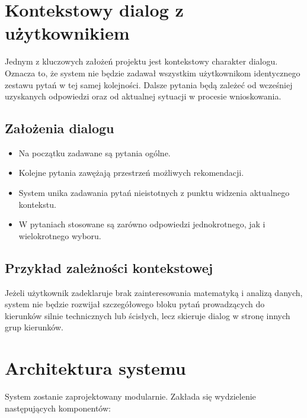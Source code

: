 \documentclass[12pt,a4paper,oneside]{article}
\begin{document}
\section{Kontekstowy dialog z użytkownikiem}

Jednym z kluczowych założeń projektu jest kontekstowy charakter dialogu. Oznacza to, że system nie będzie zadawał wszystkim użytkownikom identycznego zestawu pytań w tej samej kolejności. Dalsze pytania będą zależeć od wcześniej uzyskanych odpowiedzi oraz od aktualnej sytuacji w procesie wnioskowania.

\subsection{Założenia dialogu}

\begin{itemize}[leftmargin=1.2cm]
    \item Na początku zadawane są pytania ogólne.
    \item Kolejne pytania zawężają przestrzeń możliwych rekomendacji.
    \item System unika zadawania pytań nieistotnych z punktu widzenia aktualnego kontekstu.
    \item W pytaniach stosowane są zarówno odpowiedzi jednokrotnego, jak i wielokrotnego wyboru.
\end{itemize}

\subsection{Przykład zależności kontekstowej}

Jeżeli użytkownik zadeklaruje brak zainteresowania matematyką i analizą danych, system nie będzie rozwijał szczegółowego bloku pytań prowadzących do kierunków silnie technicznych lub ścisłych, lecz skieruje dialog w stronę innych grup kierunków.

\section{Architektura systemu}

System zostanie zaprojektowany modularnie. Zakłada się wydzielenie następujących komponentów:
\end{document}
